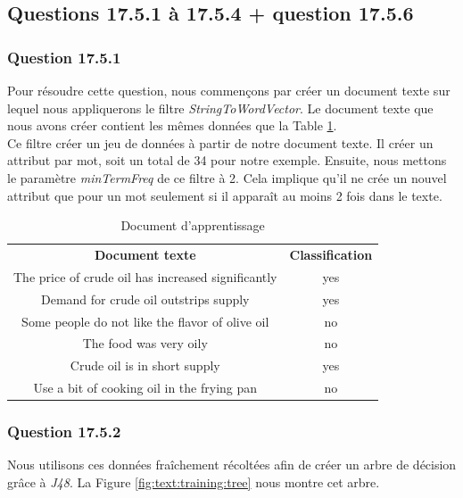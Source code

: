 \documentclass[10pt,a4paper]{article}
\begin{document}
		\subsection{Questions 17.5.1 à 17.5.4 + question 17.5.6}
		
			\subsubsection*{Question 17.5.1}
			
			Pour résoudre cette question, nous commençons par créer un document texte sur lequel nous appliquerons le filtre \textit{StringToWordVector}. Le document texte que nous avons créer contient les mêmes données que la Table \ref{tab:oil:training}.\\
			
			Ce filtre créer un jeu de données à partir de notre document texte. Il créer un attribut par mot, soit un total de 34 pour notre exemple. Ensuite, nous mettons le paramètre \textit{minTermFreq} de ce filtre à 2. Cela implique qu'il ne crée un nouvel attribut que pour un mot seulement si il apparaît au moins 2 fois dans le texte.
				
			\begin{table}[h]
				\centering
				\caption{Document d'apprentissage}
				\label{tab:oil:training}
				\begin{tabular}{|c c|}
					\hline
					\textbf{Document texte} & \textbf{Classification}\\
					The price of crude oil has increased significantly & yes\\
					Demand for crude oil outstrips supply & yes\\
					Some people do not like the flavor of olive oil & no\\
					The food was very oily & no\\
					Crude oil is in short supply & yes\\
					Use a bit of cooking oil in the frying pan & no\\
					\hline
				\end{tabular}
			\end{table}
				
			\subsubsection*{Question 17.5.2}
			
			Nous utilisons ces données fraîchement récoltées afin de créer un arbre de décision grâce à \textit{J48}. La Figure \ref{fig:text:training:tree} nous montre cet arbre.
			
\end{document}
